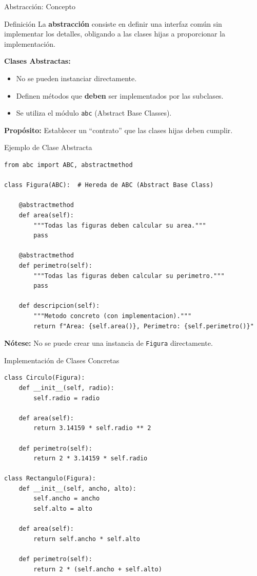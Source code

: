 \documentclass[aspectratio=169]{beamer}
\begin{document}
\begin{frame}{Abstracción: Concepto}
    \begin{block}{Definición}
        La \textbf{abstracción} consiste en definir una interfaz común sin implementar los detalles, obligando a las clases hijas a proporcionar la implementación.
    \end{block}
    \vspace{0.5cm}
    
    \textbf{Clases Abstractas:}
    \begin{itemize}
        \item No se pueden instanciar directamente.
        \item Definen métodos que \textbf{deben} ser implementados por las subclases.
        \item Se utiliza el módulo \texttt{abc} (Abstract Base Classes).
    \end{itemize}
    \vspace{0.3cm}
    
    \textbf{Propósito:} Establecer un ``contrato'' que las clases hijas deben cumplir.
\end{frame}

\begin{frame}[fragile]{Ejemplo de Clase Abstracta}
    \begin{lstlisting}[title=Definición de Clase Abstracta]
from abc import ABC, abstractmethod

class Figura(ABC):  # Hereda de ABC (Abstract Base Class)
    
    @abstractmethod
    def area(self):
        """Todas las figuras deben calcular su area."""
        pass
    
    @abstractmethod
    def perimetro(self):
        """Todas las figuras deben calcular su perimetro."""
        pass
    
    def descripcion(self):
        """Metodo concreto (con implementacion)."""
        return f"Area: {self.area()}, Perimetro: {self.perimetro()}"
    \end{lstlisting}
    
    \textbf{Nótese:} No se puede crear una instancia de \texttt{Figura} directamente.
\end{frame}

\begin{frame}[fragile]{Implementación de Clases Concretas}
    \begin{lstlisting}[title=Clases que Implementan la Abstracción]
class Circulo(Figura):
    def __init__(self, radio):
        self.radio = radio
    
    def area(self):
        return 3.14159 * self.radio ** 2
    
    def perimetro(self):
        return 2 * 3.14159 * self.radio

class Rectangulo(Figura):
    def __init__(self, ancho, alto):
        self.ancho = ancho
        self.alto = alto
    
    def area(self):
        return self.ancho * self.alto
    
    def perimetro(self):
        return 2 * (self.ancho + self.alto)
    \end{lstlisting}
\end{frame}
\end{document}
